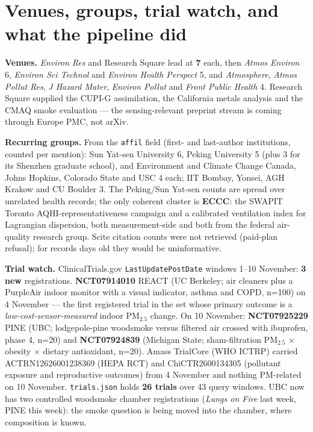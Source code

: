 \documentclass[10pt]{article}
\begin{document}
\vspace{4mm}

\par{}\baselineskip{}\baselineskip
\section*{\sffamily\bfseries\color{Deep}Venues, groups, trial watch, and what the pipeline did}
\vspace{-1.5mm}{\color{Teal}\rule{\linewidth}{1.1pt}}\vspace{2.5mm}

\footnotesize
\textbf{Venues.} \textit{Environ Res} and Research Square lead at \textbf{7} each, then \textit{Atmos Environ} 6,
\textit{Environ Sci Technol} and \textit{Environ Health Perspect} 5, and \textit{Atmosphere}, \textit{Atmos Pollut
Res}, \textit{J Hazard Mater}, \textit{Environ Pollut} and \textit{Front Public Health} 4. Research Square supplied
the CUPI-G assimilation, the California metals analysis and the CMAQ smoke evaluation --- the sensing-relevant
preprint stream is coming through Europe PMC, not arXiv.

\vspace{1.5mm}
\textbf{Recurring groups.} From the \texttt{affil} field (first- and last-author institutions, counted per mention):
Sun Yat-sen University 6, Peking University 5 (plus 3 for its Shenzhen graduate school), and Environment and Climate
Change Canada, Johns Hopkins, Colorado State and USC 4 each; IIT Bombay, Yonsei, AGH Krakow and CU Boulder 3. The
Peking/Sun Yat-sen counts are spread over unrelated health records; the only coherent cluster is \textbf{ECCC}:
the SWAPIT Toronto AQHI-representativeness campaign and a calibrated ventilation index for Lagrangian dispersion, both
measurement-side and both from the federal air-quality research group. Scite citation counts were
not retrieved (paid-plan refusal); for records days old they would be uninformative.

\vspace{1.5mm}
\textbf{Trial watch.} ClinicalTrials.gov \texttt{LastUpdatePostDate} windows 1--10 November: \textbf{3 new}
registrations. \textbf{NCT07914010} REACT (UC Berkeley; air cleaners plus a PurpleAir indoor monitor with a visual
indicator, asthma and COPD, n=100) on 4 November --- the first registered trial in the set whose primary outcome is a
\emph{low-cost-sensor-measured} indoor PM$_{2.5}$ change. On 10 November: \textbf{NCT07925229} PINE (UBC;
lodgepole-pine woodsmoke versus filtered air crossed with ibuprofen, phase 4, n=20) and \textbf{NCT07924839}
(Michigan State; sham-filtration PM$_{2.5}$ $\times$ obesity $\times$ dietary antioxidant, n=20). Amass TrialCore
(WHO ICTRP) carried ACTRN12626001238369 (HEPA RCT) and ChiCTR2600134305 (pollutant exposure and reproductive
outcomes) from 4 November and nothing PM-related on 10 November. \texttt{trials.json} holds \textbf{26 trials}
over 43 query windows. UBC now has two controlled woodsmoke chamber registrations (\emph{Lungs on Fire} last week,
PINE this week): the smoke question is being moved into the chamber, where composition is known.
\end{document}
